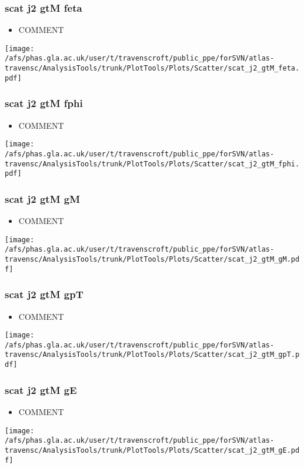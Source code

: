 \documentclass{beamer}
\begin{document}
\begin{frame}
\frametitle{scat j2 gtM feta}
\begin{itemize}
\item COMMENT
\end{itemize}
\begin{center}
\texttt{[image: /afs/phas.gla.ac.uk/user/t/travenscroft/public\_ppe/forSVN/atlas-travensc/AnalysisTools/trunk/PlotTools/Plots/Scatter/scat\_j2\_gtM\_feta.pdf]}
\end{center}
\end{frame}

\begin{frame}
\frametitle{scat j2 gtM fphi}
\begin{itemize}
\item COMMENT
\end{itemize}
\begin{center}
\texttt{[image: /afs/phas.gla.ac.uk/user/t/travenscroft/public\_ppe/forSVN/atlas-travensc/AnalysisTools/trunk/PlotTools/Plots/Scatter/scat\_j2\_gtM\_fphi.pdf]}
\end{center}
\end{frame}

\begin{frame}
\frametitle{scat j2 gtM gM}
\begin{itemize}
\item COMMENT
\end{itemize}
\begin{center}
\texttt{[image: /afs/phas.gla.ac.uk/user/t/travenscroft/public\_ppe/forSVN/atlas-travensc/AnalysisTools/trunk/PlotTools/Plots/Scatter/scat\_j2\_gtM\_gM.pdf]}
\end{center}
\end{frame}

\begin{frame}
\frametitle{scat j2 gtM gpT}
\begin{itemize}
\item COMMENT
\end{itemize}
\begin{center}
\texttt{[image: /afs/phas.gla.ac.uk/user/t/travenscroft/public\_ppe/forSVN/atlas-travensc/AnalysisTools/trunk/PlotTools/Plots/Scatter/scat\_j2\_gtM\_gpT.pdf]}
\end{center}
\end{frame}

\begin{frame}
\frametitle{scat j2 gtM gE}
\begin{itemize}
\item COMMENT
\end{itemize}
\begin{center}
\texttt{[image: /afs/phas.gla.ac.uk/user/t/travenscroft/public\_ppe/forSVN/atlas-travensc/AnalysisTools/trunk/PlotTools/Plots/Scatter/scat\_j2\_gtM\_gE.pdf]}
\end{center}
\end{frame}
\end{document}
